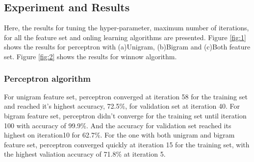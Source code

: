 \documentclass[11pt]{article}
\begin{document}
\subsection{Experiment and Results}
Here, the results for tuning the hyper-parameter, maximum number of iterations, for all the feature set and onling learning algorithms are presented. Figure \ref{fig:1} shows the results for perceptron with (a)Unigram, (b)Bigram and (c)Both feature set. Figure \ref{fig:2} shows the results for winnow algorithm.
\subsubsection{Perceptron algorithm}
For unigram feature set, perceptron converged at iteration 58 for the training set and reached it's highest accuracy, 72.5\%,  for validation set at iteration 40. For bigram feature set, perceptron didn't converge for the training set until iteration 100 with accuracy of 99.9\%. And the accuracy for validation set reached its highest on iteration10 for 62.7\%. For the one with both unigram and bigram feature set, perceptron converged quickly at iteration 15 for the training set, with the highest valiation accuracy of 71.8\% at iteration 5.
\end{document}
